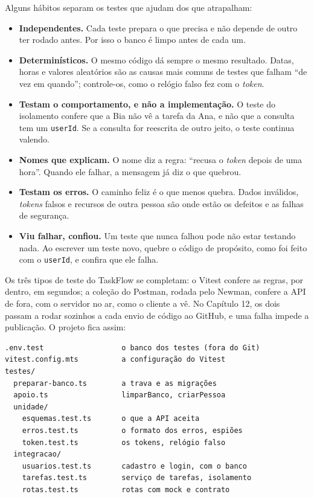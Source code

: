 Alguns hábitos separam os testes que ajudam dos que atrapalham:

\begin{itemize}
  \item \textbf{Independentes.} Cada teste prepara o que precisa e não depende de outro ter rodado antes. Por isso o banco é limpo antes de cada um.
  \item \textbf{Determinísticos.} O mesmo código dá sempre o mesmo resultado. Datas, horas e valores aleatórios são as causas mais comuns de testes que falham ``de vez em quando''; controle-os, como o relógio falso fez com o \textit{token}.
  \item \textbf{Testam o comportamento, e não a implementação.} O teste do isolamento confere que a Bia não vê a tarefa da Ana, e não que a consulta tem um \texttt{userId}. Se a consulta for reescrita de outro jeito, o teste continua valendo.
  \item \textbf{Nomes que explicam.} O nome diz a regra: ``recusa o \textit{token} depois de uma hora''. Quando ele falhar, a mensagem já diz o que quebrou.
  \item \textbf{Testam os erros.} O caminho feliz é o que menos quebra. Dados inválidos, \textit{tokens} falsos e recursos de outra pessoa são onde estão os defeitos e as falhas de segurança.
  \item \textbf{Viu falhar, confiou.} Um teste que nunca falhou pode não estar testando nada. Ao escrever um teste novo, quebre o código de propósito, como foi feito com o \texttt{userId}, e confira que ele falha.
\end{itemize}

Os três tipos de teste do TaskFlow se completam: o Vitest confere as regras, por dentro, em segundos; a coleção do Postman, rodada pelo Newman, confere a API de fora, com o servidor no ar, como o cliente a vê. No Capítulo 12, os dois passam a rodar sozinhos a cada envio de código ao GitHub, e uma falha impede a publicação. O projeto fica assim:

\begin{codigo}
\begin{Verbatim}[breaklines=true, breaksymbolleft={}, fontsize=\footnotesize]
.env.test                  o banco dos testes (fora do Git)
vitest.config.mts          a configuração do Vitest
testes/
  preparar-banco.ts        a trava e as migrações
  apoio.ts                 limparBanco, criarPessoa
  unidade/
    esquemas.test.ts       o que a API aceita
    erros.test.ts          o formato dos erros, espiões
    token.test.ts          os tokens, relógio falso
  integracao/
    usuarios.test.ts       cadastro e login, com o banco
    tarefas.test.ts        serviço de tarefas, isolamento
    rotas.test.ts          rotas com mock e contrato
\end{Verbatim}
\end{codigo}

